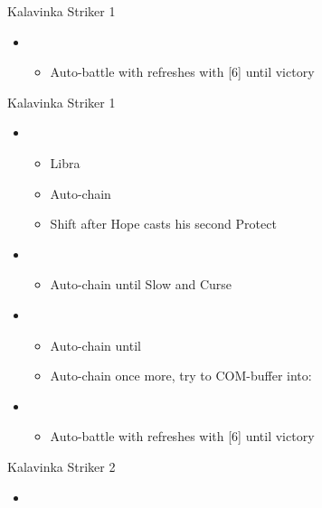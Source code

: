 \begin{paracol}{2}
\begin{battle}{Kalavinka Striker 1}
\begin{itemize}
\begin{itemize}
			      \end{itemize}
			\item \fifth
			      \begin{itemize}
				      \item Auto-battle with refreshes with [6] until victory
			      \end{itemize}
		\end{itemize}
	\end{battle}
	\switchcolumn
	\begin{battle}{Kalavinka Striker 1}
		\begin{itemize}
			\item \first
			      \begin{itemize}
				      \item Libra
				      \item Auto-chain
				      \item Shift after Hope casts his second Protect
			      \end{itemize}
			\item \second
			      \begin{itemize}
				      \item Auto-chain until Slow and Curse
			      \end{itemize}
			\item \fourth
			      \begin{itemize}
				      \item Auto-chain until \stagger
				      \item Auto-chain once more, try to COM-buffer into:
			      \end{itemize}
			\item \fifth
			      \begin{itemize}
				      \item Auto-battle with refreshes with [6] until victory
			      \end{itemize}
		\end{itemize}
	\end{battle}
	\switchcolumn*
	\renewcommand{\first}{[1] Guerilla (\rav/\syn/\sab)}
	\renewcommand{\second}{[2] Smart Bomb (\rav/\rav/\sab)}
	\renewcommand{\third}{[3] Mystic Tower}
	\renewcommand{\fourth}{[4] Relentless Assault (\rav/\rav/\com)}
	\renewcommand{\fifth}{[5] Aggression (\com/\rav/\com)}
	\begin{battle}{Kalavinka Striker 2}
		\begin{itemize}
			\item \first
			      \begin{itemize}

\end{itemize}
\end{itemize}
\end{battle}
\end{paracol}
